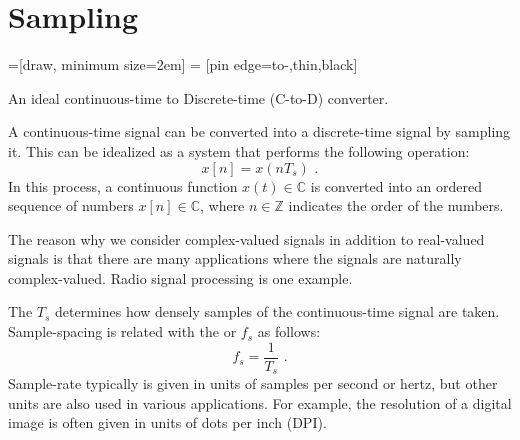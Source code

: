 \section{Sampling}
\begin{marginfigure}
=[draw, minimum size=2em]
 = [pin edge={to-,thin,black}]
\begin{center}
\end{center}
\caption{An ideal continuous-time to Discrete-time (C-to-D) converter.}
\end{marginfigure}


A continuous-time signal can be converted into a discrete-time signal
by sampling it. This can be idealized as a system that performs the following operation:
\begin{equation}
  \boxed{
    x[n] = x(n T_s)
    }\,\,.
\end{equation}
In this process, a continuous function $x(t) \in \mathbb{C}$ is converted into an ordered sequence of numbers $x[n] \in \mathbb{C}$, where $n\in\mathbb{Z}$ indicates the order of the numbers.

The reason why we consider complex-valued signals in addition to real-valued signals is that there are many applications where the signals are naturally complex-valued. Radio signal processing is one example. 

The  $T_s$ determines how densely samples of the continuous-time signal are taken. Sample-spacing is related with the  or  $f_s$ as follows:
\begin{equation}
  \boxed{
    f_s = \frac{1}{T_s}
    }\,\,.
\end{equation}
Sample-rate typically is given in units of samples per second or hertz, but other units are also used in various applications. 
For example, the resolution of a digital image is often given in units of dots per inch (DPI).

